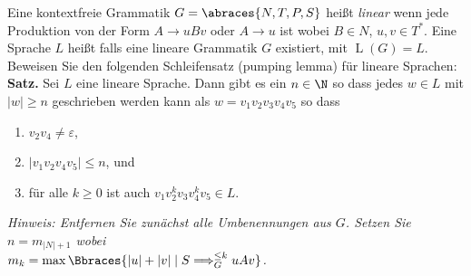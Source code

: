 
\begin{exercise}

Eine kontextfreie Grammatik $G = \abraces{N, T, P, S}$ heißt \textit{linear} wenn jede Produktion von der Form $A \to u B v$ oder $A \to u$ ist wobei $B \in N$, $u, v \in T^\ast$.
Eine Sprache $L$ heißt  falls eine lineare Grammatik $G$ existiert, mit $\operatorname L(G) = L$.
Beweisen Sie den folgenden Schleifensatz (pumping lemma) für lineare Sprachen: \\

\textbf{Satz.}
Sei $L$ eine lineare Sprache.
Dann gibt es ein $n \in \N$ so dass jedes $w \in L$ mit $|w| \geq n$ geschrieben werden kann als $w = v_1 v_2 v_3 v_4 v_5$ so dass

\begin{enumerate}
    \item $v_2 v_4 \neq \varepsilon$,
    \item $|v_1 v_2 v_4 v_5| \leq n$, und
    \item für alle $k \geq 0$ ist auch $v_1 v_2^k v_3 v_4^k v_5 \in L$.
\end{enumerate}

\textit{Hinweis: Entfernen Sie zunächst alle Umbenennungen aus $G$. Setzen Sie $n = m_{|N| + 1}$ wobei \\ $m_k = \max \Bbraces{|u| + |v| \mid S \Longrightarrow_G^{\leq k} u A v}$.}

\end{exercise}



